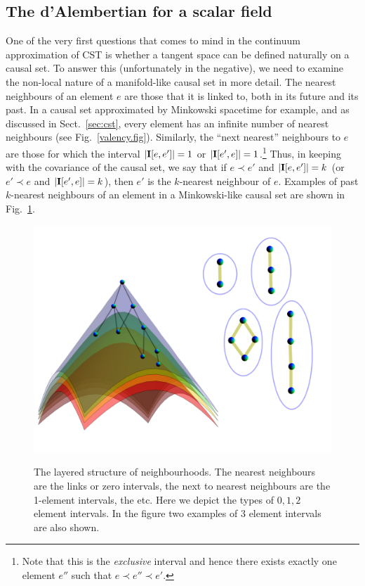 \subsection{The d'Alembertian  for a scalar field } 
\label{ssec:dalem}

One of the very first questions that comes to mind in the continuum approximation of CST is whether a tangent space  can
be defined naturally on a causal set. To answer this (unfortunately in the negative), we need to examine  the non-local nature of a
manifold-like causal set in more detail. 
The nearest neighbours of an element $e$ are
those that it is linked to, both in its future and its past. In a causal set approximated by Minkowski spacetime for
example, and  as discussed in Sect.~\ref{sec:cst}, every element has an infinite number of nearest neighbours (see Fig.~\ref{valency.fig}).  Similarly, the 
``next nearest'' neighbours  to $e$ are those for which the interval $|\mathbf I[e,e']| =1$ or $| \mathbf I[e',e]|=1$.\footnote{Note that this is the \emph{exclusive} interval and hence there exists exactly
  one element $e''$ such that $e\prec e'' \prec e'$.} 
Thus, in keeping with the covariance of the causal set, we say
that if $e\prec e' $ and $|\mathbf I[e,e']|=k$ (or $e'\prec e$ and $|\mathbf I[e',e]|=k$),  then    
$e'$ is the $k$-nearest neighbour of
$e$.  Examples of past $k$-nearest
neighbours of an element in a Minkowski-like causal set are shown in Fig.~\ref{nn.fig}.
\begin{figure}[!htb]
  \centering \resizebox{3.0in}{!}  {\includegraphics[width=\textwidth]{Intervals}}
\caption{The layered structure of neighbourhoods. The nearest neighbours are the links or zero intervals, the
    next to nearest neighbours are the 1-element intervals, the etc. Here we depict the types of $0,1,2$ element
    intervals. In the figure two examples of  $3$ element intervals are also shown.}
\label{nn.fig}
\end{figure}


